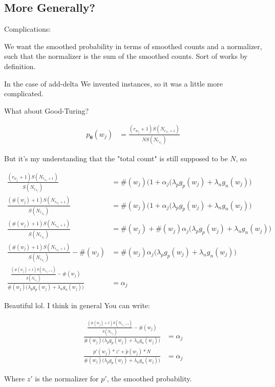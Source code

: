 \documentclass{article}
\newcommand{\vtheta}{\boldsymbol{\theta}}
\newcommand{\model}{p_{\vtheta}}
\begin{document}
	\subsection{More Generally?}
	
		Complications:
		
		We want the smoothed probability in terms of smoothed counts and a normalizer, such that the normalizer is the sum of the smoothed counts. Sort of works by definition.
		
		In the case of add-delta We invented instances, so it was a little more complicated.
		
		What about Good-Turing?
		
		\begin{align}
			\model(w_j) &= \frac{(r_{w_j}+1)S(N_{r_{w_j}+1})}{NS(N_{r_{w_j}})}
		\end{align}
		
		But it's my understanding that the "total count" is still supposed to be $N$, so
		
		\begin{align}
			\frac{(r_{w_j}+1)S(N_{r_{w_j}+1})}{S(N_{r_{w_j}})} &= \#(w_j)\bigg(1 +\alpha_j\bigg(\lambda_p g_p(w_j) +\lambda_n g_n(w_j)\bigg)\\
			\frac{(\#(w_j)+1)S(N_{r_{w_j}+1})}{S(N_{r_{w_j}})} &= \#(w_j)\bigg(1 +\alpha_j\bigg(\lambda_p g_p(w_j) +\lambda_n g_n(w_j)\bigg)\\
			\frac{(\#(w_j)+1)S(N_{r_{w_j}+1})}{S(N_{r_{w_j}})} &= \#(w_j) +\#(w_j)\alpha_j\bigg(\lambda_p g_p(w_j) +\lambda_n g_n(w_j)\bigg)\\
			\frac{(\#(w_j)+1)S(N_{r_{w_j}+1})}{S(N_{r_{w_j}})} - \#(w_j) &= \#(w_j)\alpha_j\bigg(\lambda_p g_p(w_j) +\lambda_n g_n(w_j)\bigg)\\
			\frac{\frac{(\#(w_j)+1)S(N_{r_{w_j}+1})}{S(N_{r_{w_j}})} - \#(w_j)}{\#(w_j)\bigg(\lambda_p g_p(w_j) +\lambda_n g_n(w_j)\bigg)} &= \alpha_j
		\end{align}
		
		Beautiful lol. I think in general You can write:
		
		\begin{align}
			\frac{\frac{(\#(w_j)+1)S(N_{r_{w_j}+1})}{S(N_{r_{w_j}})} - \#(w_j)}{\#(w_j)\bigg(\lambda_p g_p(w_j) +\lambda_n g_n(w_j)\bigg)} &= \alpha_j\\
			\frac{p'(w_j) * z' + \tilde{p}(w_j)*N}{\#(w_j)\bigg(\lambda_p g_p(w_j) +\lambda_n g_n(w_j)\bigg)} &= \alpha_j
		\end{align}
		
		Where $z'$ is the normalizer for $p'$, the smoothed probability.
		
\end{document}
